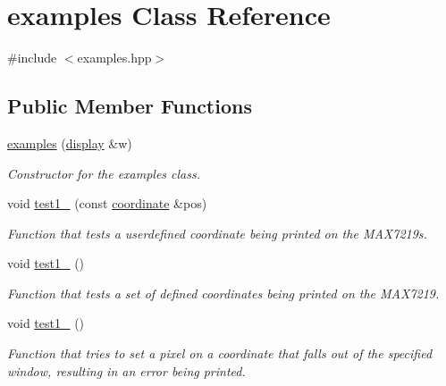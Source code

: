 \hypertarget{classexamples}{}\section{examples Class Reference}
\label{classexamples}


{\ttfamily \#include $<$examples.\+hpp$>$}

\subsection*{Public Member Functions}
\begin{DoxyCompactItemize}
\item 
\hyperlink{classexamples_abdfb38b58f50be613521f520956a0fad}{examples} (\hyperlink{classdisplay}{display} \&w)
\begin{DoxyCompactList}\small\item\em Constructor for the examples class. \end{DoxyCompactList}\item 
void \hyperlink{classexamples_a5d5e66c26cc943e53c97f8f6d23b7865}{test1\+\_} (const \hyperlink{classcoordinate}{coordinate} \&pos)
\begin{DoxyCompactList}\small\item\em Function that tests a userdefined coordinate being printed on the M\+A\+X7219s. \end{DoxyCompactList}\item 
\mbox{\label{classexamples_a37dc712f99da1da430c42f32d3d721f4}} 
void \hyperlink{classexamples_a37dc712f99da1da430c42f32d3d721f4}{test1\+\_} ()
\begin{DoxyCompactList}\small\item\em Function that tests a set of defined coordinates being printed on the M\+A\+X7219. \end{DoxyCompactList}\item 
\mbox{\label{classexamples_ac9fef29d3e131634dbc7d393fda93711}} 
void \hyperlink{classexamples_ac9fef29d3e131634dbc7d393fda93711}{test1\+\_} ()
\begin{DoxyCompactList}\small\item\em Function that tries to set a pixel on a coordinate that falls out of the specified window, resulting in an error being printed. \end{DoxyCompactList}\item 
\mbox{\label{classexamples_a380d9b60c1e5ecb6977a07cad5046579}} 

\end{DoxyCompactItemize}
